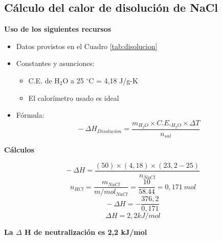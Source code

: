 \documentclass[10pt]{article}
\begin{document}
\subsection{Cálculo del calor de disolución de NaCl}

\textbf{Uso de los siguientes recursos}
    \begin{itemize}
        \item Datos provistos en el Cuadro \ref{tab:disolucion}
        \item Constantes y asunciones:
        \begin{itemize}
            \item C.E. de H$_{2}$O a 25 $^\circ$C = 4,18 J/g-K
            \item El calorímetro usado es ideal
        \end{itemize}
        \item Fórmula:
        \begin{equation}
             - ~\Delta H_{Disoluci\acute{o}n} = \frac{m_{H_{2}O} \times C.E._{H_{2}O} \times\Delta T}{n_{sal}}
        \end{equation}
    \end{itemize}

\textbf{Cálculos}

\begin{equation*}
             - ~\Delta H = \frac{(50)\times(4,18)\times(23,2-25)}{n_{NaCl}}
        \end{equation*}
\vspace{0.1cm}
\begin{equation*}
            n_{HCl} = \frac{m_{NaCl}}{m/mol_{NaCl}} = \frac{10}{58.44} = 0,171 ~ mol
        \end{equation*}
 \vspace{0.1cm}       
\begin{equation*}
            - ~\Delta H = -\frac{376,2}{0,171}
        \end{equation*}
\vspace{0.1cm}
\begin{equation*}
           \Delta H = 2,2 kJ/mol
        \end{equation*}
\begin{center}
    \textbf{La $\Delta$ H de neutralización es 2,2 kJ/mol}
\end{center}
\end{document}
